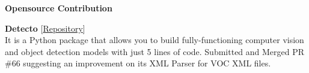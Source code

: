 \begin{rSection}{\textbf{Opensource Contribution}}

{\bf Detecto}\hfill{\hspace{2em} [\href{https://github.com/alankbi/detecto}{Repository}]}\\
It is a Python package that allows you to build fully-functioning computer vision and object detection models with just 5 lines of code. Submitted and Merged PR \#66 suggesting an improvement on its XML Parser for VOC XML files.

\end{rSection}
